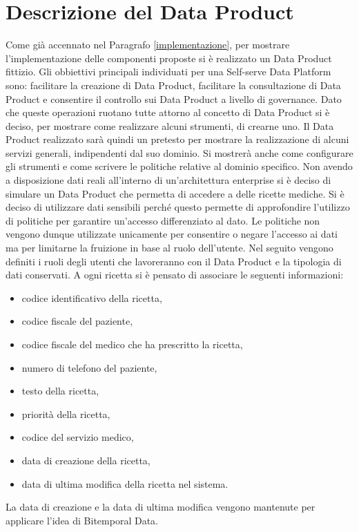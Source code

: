 \documentclass[12pt]{report}
\begin{document}
\section{Descrizione del Data Product}\label{caratteristicheDP}
Come già accennato nel Paragrafo \ref{implementazione}, per mostrare l'implementazione delle componenti proposte si è realizzato un Data Product fittizio.
Gli obbiettivi principali individuati per una Self-serve Data Platform sono: facilitare la creazione di Data Product, facilitare la consultazione di Data Product e consentire il controllo sui Data Product a livello di governance. 
Dato che queste operazioni ruotano tutte attorno al concetto di Data Product si è deciso, per mostrare come realizzare alcuni strumenti, di crearne uno.
Il Data Product realizzato sarà quindi un pretesto per mostrare la realizzazione di alcuni servizi generali, indipendenti dal suo dominio.
Si mostrerà anche come configurare gli strumenti e come scrivere le politiche relative al dominio specifico. 
Non avendo a disposizione dati reali all'interno di un'architettura enterprise si è deciso di simulare un Data Product che permetta di accedere a delle ricette mediche. 
Si è deciso di utilizzare dati sensibili perché questo permette di approfondire l'utilizzo di politiche per garantire un'accesso differenziato al dato.
Le politiche non vengono dunque utilizzate unicamente per consentire o negare l'accesso ai dati ma per limitarne la fruizione in base al ruolo dell'utente. 
Nel seguito vengono definiti i ruoli degli utenti che lavoreranno con il Data Product e la tipologia di dati conservati.  
A ogni ricetta si è pensato di associare le seguenti informazioni:\begin{itemize}
    \item codice identificativo della ricetta,
    \item codice fiscale del paziente,
    \item codice fiscale del medico che ha prescritto la ricetta,
    \item numero di telefono del paziente,
    \item testo della ricetta,
    \item priorità della ricetta,
    \item codice del servizio medico,
    \item data di creazione della ricetta,
    \item data di ultima modifica della ricetta nel sistema. 
\end{itemize}
La data di creazione e la data di ultima modifica vengono mantenute per applicare l'idea di Bitemporal Data.
\end{document}
